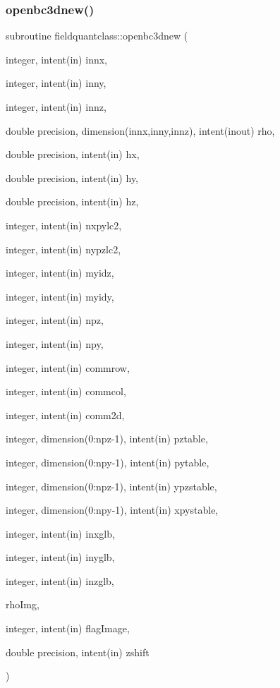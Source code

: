 \subsubsection{\texorpdfstring{openbc3dnew()}{openbc3dnew()}}
{\footnotesize\ttfamily subroutine fieldquantclass\+::openbc3dnew (\begin{DoxyParamCaption}\item[{integer, intent(in)}]{innx,  }\item[{integer, intent(in)}]{inny,  }\item[{integer, intent(in)}]{innz,  }\item[{double precision, dimension(innx,inny,innz), intent(inout)}]{rho,  }\item[{double precision, intent(in)}]{hx,  }\item[{double precision, intent(in)}]{hy,  }\item[{double precision, intent(in)}]{hz,  }\item[{integer, intent(in)}]{nxpylc2,  }\item[{integer, intent(in)}]{nypzlc2,  }\item[{integer, intent(in)}]{myidz,  }\item[{integer, intent(in)}]{myidy,  }\item[{integer, intent(in)}]{npz,  }\item[{integer, intent(in)}]{npy,  }\item[{integer, intent(in)}]{commrow,  }\item[{integer, intent(in)}]{commcol,  }\item[{integer, intent(in)}]{comm2d,  }\item[{integer, dimension(0\+:npz-\/1), intent(in)}]{pztable,  }\item[{integer, dimension(0\+:npy-\/1), intent(in)}]{pytable,  }\item[{integer, dimension(0\+:npz-\/1), intent(in)}]{ypzstable,  }\item[{integer, dimension(0\+:npy-\/1), intent(in)}]{xpystable,  }\item[{integer, intent(in)}]{inxglb,  }\item[{integer, intent(in)}]{inyglb,  }\item[{integer, intent(in)}]{inzglb,  }\item[{}]{rho\+Img,  }\item[{integer, intent(in)}]{flag\+Image,  }\item[{double precision, intent(in)}]{zshift }\end{DoxyParamCaption})}



